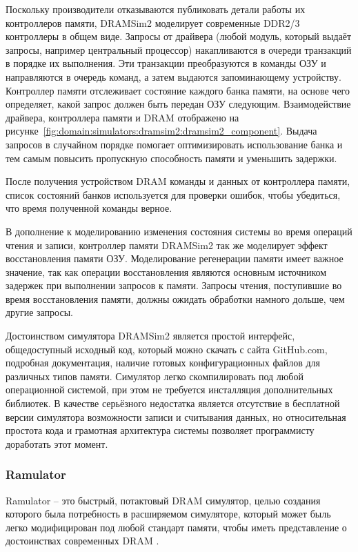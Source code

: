 Поскольку производители отказываются публиковать детали работы их контроллеров памяти, DRAMSim2 моделирует современные DDR2/3 контроллеры в общем виде. Запросы от драйвера (любой модуль, который выдаёт запросы, например центральный процессор) накапливаются в очереди транзакций в порядке их выполнения.  Эти транзакции преобразуются в команды ОЗУ и направляются в очередь команд, а затем выдаются запоминающему устройству. Контроллер памяти отслеживает состояние каждого банка памяти, на основе чего определяет, какой запрос должен быть передан ОЗУ следующим. Взаимодействие драйвера, контроллера памяти и DRAM отображено на рисунке~\ref{fig:domain:simulators:dramsim2:dramsim2_component}. Выдача запросов в случайном порядке помогает оптимизировать использование банка и тем самым повысить пропускную способность памяти и уменьшить задержки.

После получения устройством DRAM команды и данных от контроллера памяти, список состояний банков используется для проверки ошибок, чтобы убедиться, что время полученной команды верное. 

В дополнение к моделированию изменения состояния системы во время операций чтения и записи, контроллер памяти DRAMSim2 так же моделирует эффект восстановления памяти ОЗУ. Моделирование регенерации памяти имеет важное значение, так как операции восстановления являются основным источником задержек при выполнении запросов к памяти. Запросы чтения, поступившие во время восстановления памяти, должны ожидать обработки намного дольше, чем другие запросы. 

Достоинством симулятора DRAMSim2 является простой интерфейс, общедоступный исходный код, который можно скачать с сайта GitHub.com, подробная документация, наличие готовых конфигурационных файлов для различных типов памяти. Симулятор легко скомпилировать под любой операционной системой, при этом не требуется инсталляция дополнительных библиотек.  В качестве серьёзного недостатка является отсутствие в бесплатной версии симулятора возможности записи и считывания данных, но относительная простота кода и грамотная архитектура системы позволяет программисту доработать этот момент.  

\subsubsection{Ramulator}
\label{sub:domain:simulators:ramulator}
Ramulator – это быстрый, потактовый DRAM симулятор, целью создания которого была потребность в расширяемом симуляторе, который может быль легко модифицирован под любой стандарт памяти, чтобы иметь представление о достоинствах современных DRAM \cite{ramulator_manual}.

